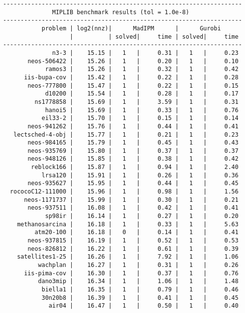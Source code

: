 \begin{lstlisting}
--------------------------------------------------------------------
              MIPLIB benchmark results (tol = 1.0e-8)
--------------------------------------------------------------------
           problem | log2(nnz)|      MadIPM      |      Gurobi        
                   |          | solved|     time | solved|     time     
--------------------------------------------------------------------
              n3-3 |    15.15 |   1   |     0.31 |   1   |     0.23
       neos-506422 |    15.26 |   1   |     0.20 |   1   |     0.10
            ramos3 |    15.26 |   1   |     0.32 |   1   |     0.42
      iis-bupa-cov |    15.42 |   1   |     0.22 |   1   |     0.28
       neos-777800 |    15.47 |   1   |     0.22 |   1   |     0.15
            d10200 |    15.54 |   1   |     0.28 |   1   |     0.17
         ns1778858 |    15.69 |   1   |     3.59 |   1   |     0.31
            hanoi5 |    15.69 |   1   |     0.33 |   1   |     0.76
           eil33-2 |    15.70 |   1   |     0.15 |   1   |     0.14
       neos-941262 |    15.76 |   1   |     0.44 |   1   |     0.41
   lectsched-4-obj |    15.77 |   1   |     0.21 |   1   |     0.23
       neos-984165 |    15.79 |   1   |     0.45 |   1   |     0.43
       neos-935769 |    15.80 |   1   |     0.37 |   1   |     0.37
       neos-948126 |    15.85 |   1   |     0.38 |   1   |     0.42
        reblock166 |    15.87 |   1   |     0.94 |   1   |     2.40
           lrsa120 |    15.91 |   1   |     0.26 |   1   |     0.36
       neos-935627 |    15.95 |   1   |     0.44 |   1   |     0.45
  rococoC12-111000 |    15.96 |   1   |     0.98 |   1   |     1.56
      neos-1171737 |    15.99 |   1   |     0.30 |   1   |     0.21
       neos-937511 |    16.08 |   1   |     0.42 |   1   |     0.41
            sp98ir |    16.14 |   1   |     0.27 |   1   |     0.20
    methanosarcina |    16.18 |   1   |     0.33 |   1   |     5.63
         atm20-100 |    16.18 |   0   |     0.14 |   1   |     0.41
       neos-937815 |    16.19 |   1   |     0.52 |   1   |     0.53
       neos-826812 |    16.22 |   1   |     0.61 |   1   |     0.39
    satellites1-25 |    16.26 |   1   |     7.92 |   1   |     1.06
          wachplan |    16.27 |   1   |     0.31 |   1   |     0.26
      iis-pima-cov |    16.30 |   1   |     0.37 |   1   |     0.76
          dano3mip |    16.34 |   1   |     1.06 |   1   |     1.48
           biella1 |    16.35 |   1   |     0.79 |   1   |     0.46
           30n20b8 |    16.39 |   1   |     0.41 |   1   |     0.45
             air04 |    16.47 |   1   |     0.50 |   1   |     0.40

\end{lstlisting}
